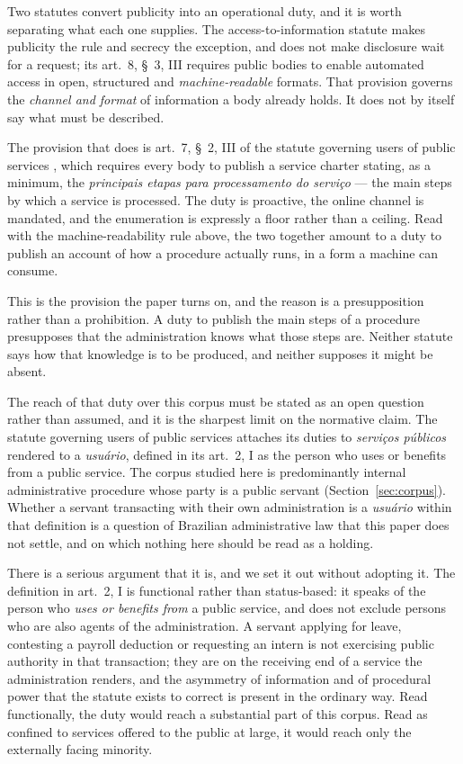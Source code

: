 Two statutes convert publicity into an operational duty, and it is worth separating what each
one supplies. The access-to-information statute \citep{brasil2011lai} makes publicity the rule
and secrecy the exception, and does not make disclosure wait for a request; its art.~8, \S~3,
III requires public bodies to enable automated access in open, structured and
\emph{machine-readable} formats. That provision governs the \emph{channel and format} of
information a body already holds. It does not by itself say what must be described.

The provision that does is art.~7, \S~2, III of the statute governing users of public services
\citep{brasil2017cdu}, which requires every body to publish a service charter stating, as a
minimum, the \emph{principais etapas para processamento do serviço} --- the main steps by which
a service is processed. The duty is proactive, the online channel is mandated, and the
enumeration is expressly a floor rather than a ceiling. Read with the machine-readability rule
above, the two together amount to a duty to publish an account of how a procedure actually runs,
in a form a machine can consume.

This is the provision the paper turns on, and the reason is a presupposition rather than a
prohibition. A duty to publish the main steps of a procedure presupposes that the administration
knows what those steps are. Neither statute says how that knowledge is to be produced, and
neither supposes it might be absent.

The reach of that duty over this corpus must be stated as an open question rather than assumed,
and it is the sharpest limit on the normative claim. The statute governing users of public
services attaches its duties to \emph{serviços públicos} rendered to a \emph{usuário}, defined
in its art.~2, I as the person who uses or benefits from a public service. The corpus studied
here is predominantly internal administrative procedure whose party is a public servant
(Section~\ref{sec:corpus}). Whether a servant transacting with their own administration is a
\emph{usuário} within that definition is a question of Brazilian administrative law that this
paper does not settle, and on which nothing here should be read as a holding.

There is a serious argument that it is, and we set it out without adopting it. The definition in
art.~2, I is functional rather than status-based: it speaks of the person who \emph{uses or
benefits from} a public service, and does not exclude persons who are also agents of the
administration. A servant applying for leave, contesting a payroll deduction or requesting an
intern is not exercising public authority in that transaction; they are on the receiving end of
a service the administration renders, and the asymmetry of information and of procedural power
that the statute exists to correct is present in the ordinary way. Read functionally, the duty
would reach a substantial part of this corpus. Read as confined to services offered to the
public at large, it would reach only the externally facing minority.

